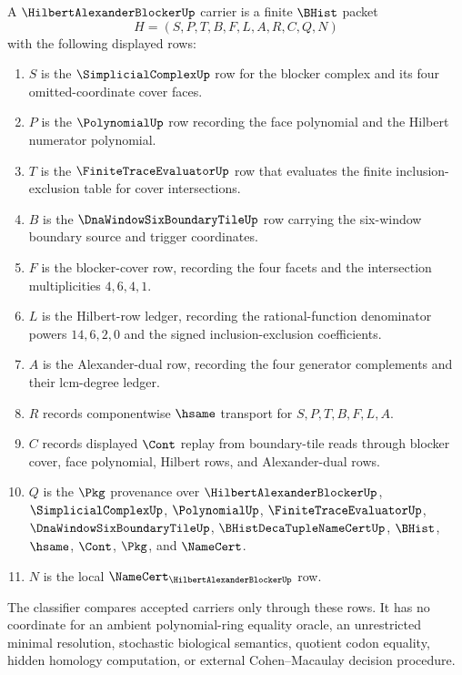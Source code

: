 \begin{definition}
\label{def:hilbert-alexander-blocker-carrier}
A $\HilbertAlexanderBlockerUp$ carrier is a finite $\BHist$ packet
$$
H=(S,P,T,B,F,L,A,R,C,Q,N)
$$
with the following displayed rows:
\begin{enumerate}
\item $S$ is the $\SimplicialComplexUp$ row for the blocker complex and its four omitted-coordinate cover faces.
\item $P$ is the $\PolynomialUp$ row recording the face polynomial and the Hilbert numerator polynomial.
\item $T$ is the $\FiniteTraceEvaluatorUp$ row that evaluates the finite inclusion-exclusion table for cover intersections.
\item $B$ is the $\DnaWindowSixBoundaryTileUp$ row carrying the six-window boundary source and trigger coordinates.
\item $F$ is the blocker-cover row, recording the four facets and the intersection multiplicities $4,6,4,1$.
\item $L$ is the Hilbert-row ledger, recording the rational-function denominator powers $14,6,2,0$ and the signed inclusion-exclusion coefficients.
\item $A$ is the Alexander-dual row, recording the four generator complements and their lcm-degree ledger.
\item $R$ records componentwise $\hsame$ transport for $S,P,T,B,F,L,A$.
\item $C$ records displayed $\Cont$ replay from boundary-tile reads through blocker cover, face polynomial, Hilbert rows, and Alexander-dual rows.
\item $Q$ is the $\Pkg$ provenance over $\HilbertAlexanderBlockerUp$, $\SimplicialComplexUp$, $\PolynomialUp$, $\FiniteTraceEvaluatorUp$, $\DnaWindowSixBoundaryTileUp$, $\BHistDecaTupleNameCertUp$, $\BHist$, $\hsame$, $\Cont$, $\Pkg$, and $\NameCert$.
\item $N$ is the local $\NameCert_{\HilbertAlexanderBlockerUp}$ row.
\end{enumerate}
The classifier compares accepted carriers only through these rows. It has no coordinate for an ambient polynomial-ring equality oracle, an unrestricted minimal resolution, stochastic biological semantics, quotient codon equality, hidden homology computation, or external Cohen--Macaulay decision procedure.
\end{definition}

